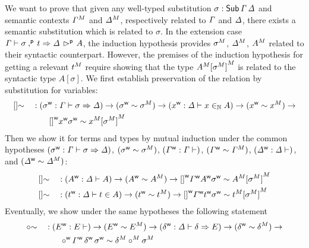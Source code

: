 We want to prove that given any well-typed substitution $\sigma
: \mathsf{Sub}\,\mathit{\Gamma}\,\mathit{\Delta}$ and semantic contexts ${\mathit{\Gamma}}^M$ and
${\mathit{\Delta}}^M$, respectively related to $\mathit{\Gamma}$ and $\mathit{\Delta}$, there exists a
semantic substitution which is related to $\sigma$.  In the extension case
$\mathit{\Gamma}\vdash \sigma \mathbin{{,}^{\mathsf{p}}}\,t\Rightarrow \mathit{\Delta}\,\mathbin{{\rhd}^{\mathsf{p}}}\,A$, the induction
hypothesis provides ${\sigma}^M$, ${\mathit{\Delta}}^M$, ${A}^M$ related to
their syntactic counterpart. However, the premises of the induction hypothesis
for getting a relevant ${t}^M$ require showing that the type
${A}^M{[{\sigma}^M]}^M$ is related to the syntactic type
$A[\sigma]$. We first establish preservation of the relation by substitution for
variables:
\begin{alignat*}{5}
  & []{\sim} && :
  ({\sigma}^{\mathsf{w}} : \mathit{\Gamma} \vdash \sigma \Rightarrow \mathit{\Delta}) \rightarrow
  ({\sigma}^{\mathsf{w}} \sim {\sigma}^M) \rightarrow
  ({x}^{\mathsf{w}} : \mathit{\Delta} \vdash x \in_{\mathbb{N}} A) \rightarrow
  ({x}^{\mathsf{w}} \sim {x}^M) \rightarrow
  \\ & && \qquad
   {[]}^{\mathsf{w}}{x}^{\mathsf{w}}{\sigma}^{\mathsf{w}} \sim {x}^M{[{\sigma}^M]}^M
\end{alignat*}
Then we show it for terms and types  by mutual induction
under the common hypotheses
  $({\sigma}^{\mathsf{w}} : \mathit{\Gamma} \vdash \sigma \Rightarrow \mathit{\Delta})$,
  $({\sigma}^{\mathsf{w}} \sim {\sigma}^M)$,
  $({\mathit{\Gamma}}^{\mathsf{w}} : \mathit{\Gamma} \vdash )$,
  $({\mathit{\Gamma}}^{\mathsf{w}} \sim {\mathit{\Gamma}}^M)$,
    $({\mathit{\Delta}}^{\mathsf{w}} : \mathit{\Delta} \vdash )$,
    and
  $({\mathit{\Delta}}^{\mathsf{w}} \sim {\mathit{\Delta}}^M)$:
\begin{alignat*}{5}
     & []{\sim} && :
    ({A}^{\mathsf{w}} : \mathit{\Delta} \vdash A) \rightarrow
  ({A}^{\mathsf{w}} \sim {A}^M) \rightarrow
   {[]}^{\mathsf{w}}{\mathit{\Gamma}}^{\mathsf{w}}{A}^{\mathsf{w}}{\sigma}^{\mathsf{w}} \sim {A}^M{[{\sigma}^M]}^M
   \\
     & []{\sim} && :
    ({t}^{\mathsf{w}} : \mathit{\Delta} \vdash t \in A ) \rightarrow
  ({t}^{\mathsf{w}} \sim {t}^M) \rightarrow
   {[]}^{\mathsf{w}}{\mathit{\Gamma}}^{\mathsf{w}}{t}^{\mathsf{w}}{\sigma}^{\mathsf{w}} \sim {t}^M{[{\sigma}^M]}^M
  \end{alignat*}
  Eventually, we show under the same hypotheses the following statement
  \begin{alignat*}{5}
     & {\circ}{\sim} && :
    ({E}^{\mathsf{w}} : E \vdash ) \rightarrow
  ({E}^{\mathsf{w}} \sim {E}^M) \rightarrow
    ({\delta}^{\mathsf{w}} : \mathit{\Delta} \vdash \delta \Rightarrow E) \rightarrow
  ({\delta}^{\mathsf{w}} \sim {\delta}^M) \rightarrow
  \\
  & && \qquad
   {{\circ}}^{\mathsf{w}}\,{\mathit{\Gamma}}^{\mathsf{w}}\,{\delta}^{\mathsf{w}}\,{\sigma}^{\mathsf{w}} \sim {\delta}^M\mathbin{{\circ}^M}{\sigma}^M
  \end{alignat*}
